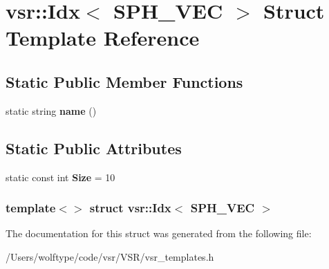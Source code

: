 \hypertarget{structvsr_1_1_idx_3_01_s_p_h___v_e_c_01_4}{\section{vsr\-:\-:Idx$<$ S\-P\-H\-\_\-\-V\-E\-C $>$ Struct Template Reference}
\label{structvsr_1_1_idx_3_01_s_p_h___v_e_c_01_4}
}
\subsection*{Static Public Member Functions}
\begin{DoxyCompactItemize}
\item 
\hypertarget{structvsr_1_1_idx_3_01_s_p_h___v_e_c_01_4_a93398d9837870ffdc51b24262781c2b8}{static string {\bfseries name} ()}\label{structvsr_1_1_idx_3_01_s_p_h___v_e_c_01_4_a93398d9837870ffdc51b24262781c2b8}

\end{DoxyCompactItemize}
\subsection*{Static Public Attributes}
\begin{DoxyCompactItemize}
\item 
\hypertarget{structvsr_1_1_idx_3_01_s_p_h___v_e_c_01_4_a0ddd0ddf777c64b34f270a8989ae8373}{static const int {\bfseries Size} = 10}\label{structvsr_1_1_idx_3_01_s_p_h___v_e_c_01_4_a0ddd0ddf777c64b34f270a8989ae8373}

\end{DoxyCompactItemize}
\subsubsection*{template$<$$>$ struct vsr\-::\-Idx$<$ S\-P\-H\-\_\-\-V\-E\-C $>$}



The documentation for this struct was generated from the following file\-:\begin{DoxyCompactItemize}
\item 
/\-Users/wolftype/code/vsr/\-V\-S\-R/vsr\-\_\-templates.\-h\end{DoxyCompactItemize}

